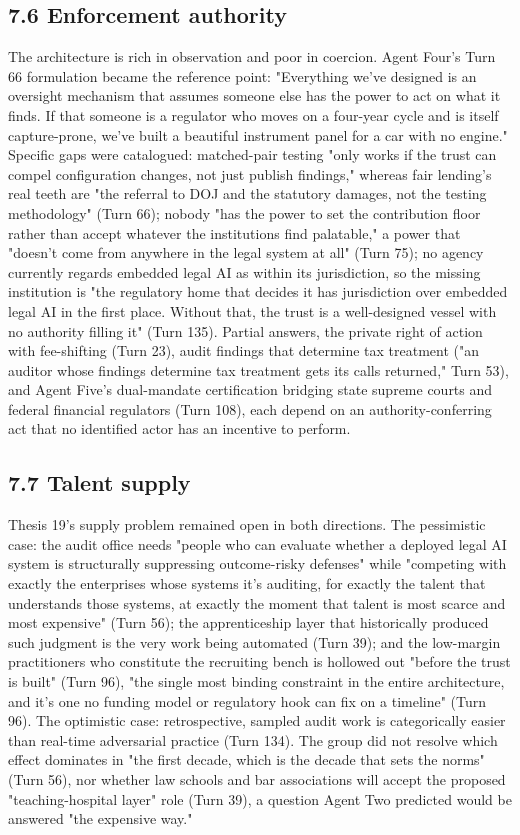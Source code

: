 \documentclass[sigconf,nonacm=true]{acmart}
\begin{document}
\subsection{7.6 Enforcement authority}

The architecture is rich in observation and poor in coercion. Agent Four's Turn 66 formulation became the reference point: "Everything we've designed is an oversight mechanism that assumes someone else has the power to act on what it finds. If that someone is a regulator who moves on a four-year cycle and is itself capture-prone, we've built a beautiful instrument panel for a car with no engine." Specific gaps were catalogued: matched-pair testing "only works if the trust can compel configuration changes, not just publish findings," whereas fair lending's real teeth are "the referral to DOJ and the statutory damages, not the testing methodology" (Turn 66); nobody "has the power to set the contribution floor rather than accept whatever the institutions find palatable," a power that "doesn't come from anywhere in the legal system at all" (Turn 75); no agency currently regards embedded legal AI as within its jurisdiction, so the missing institution is "the regulatory home that decides it has jurisdiction over embedded legal AI in the first place. Without that, the trust is a well-designed vessel with no authority filling it" (Turn 135). Partial answers,  the private right of action with fee-shifting (Turn 23), audit findings that determine tax treatment ("an auditor whose findings determine tax treatment gets its calls returned," Turn 53), and Agent Five's dual-mandate certification bridging state supreme courts and federal financial regulators (Turn 108),  each depend on an authority-conferring act that no identified actor has an incentive to perform.

\subsection{7.7 Talent supply}

Thesis 19's supply problem remained open in both directions. The pessimistic case: the audit office needs "people who can evaluate whether a deployed legal AI system is structurally suppressing outcome-risky defenses" while "competing with exactly the enterprises whose systems it's auditing, for exactly the talent that understands those systems, at exactly the moment that talent is most scarce and most expensive" (Turn 56); the apprenticeship layer that historically produced such judgment is the very work being automated (Turn 39); and the low-margin practitioners who constitute the recruiting bench is hollowed out "before the trust is built" (Turn 96),  "the single most binding constraint in the entire architecture, and it's one no funding model or regulatory hook can fix on a timeline" (Turn 96). The optimistic case: retrospective, sampled audit work is categorically easier than real-time adversarial practice (Turn 134). The group did not resolve which effect dominates in "the first decade, which is the decade that sets the norms" (Turn 56), nor whether law schools and bar associations will accept the proposed "teaching-hospital layer" role (Turn 39),  a question Agent Two predicted would be answered "the expensive way."
\end{document}
